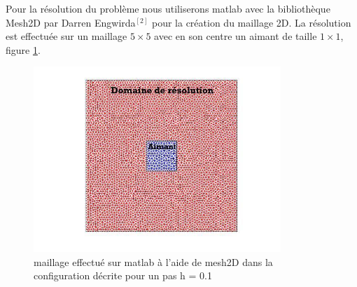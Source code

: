 \documentclass[a4paper,12pt,titlepage]{report}
\begin{document}
\begin{onehalfspace}
Pour la résolution du problème nous utiliserons matlab avec la bibliothèque Mesh2D par Darren Engwirda$^{[2]}$ pour la création du maillage 2D.
La résolution est effectuée sur un maillage $5\times 5$ avec en son centre un aimant de taille $1\times 1$, figure \ref{prout}.

\begin{figure}[h]
	\begin{center}
	\includegraphics[height = 7cm, keepaspectratio]{graphes/maillage_resolution_champ_magnetique.jpg} 
	\caption{\label{figure 3 } maillage effectué sur matlab à l'aide de mesh2D dans la configuration décrite pour un pas h = 0.1}
	\label{prout}
	\end{center}
\end{figure}


\end{onehalfspace}
\end{document}

